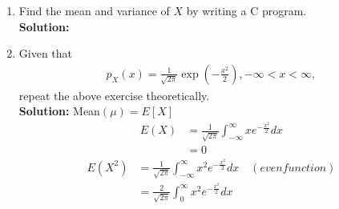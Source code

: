 \documentclass{article}
\numberwithin{equation}{subsection}
\numberwithin{figure}{subsection}
\providecommand{\brak}[1]{\ensuremath{\left(#1\right)}}
\providecommand{\sbrak}[1]{\ensuremath{{}\left[#1\right]}}
\newcommand{\solution}{\noindent \textbf{Solution: }}
\renewcommand\thesection{\arabic{section}}
\renewcommand\thesubsection{\thesection.\arabic{subsection}}
\begin{document}
\begin{enumerate}[label=\thesubsection.\arabic*,ref=\thesubsection.\arabic{figure}]
What properties does the PDF have?
\\
\solution The PDF of $X$ is plotted in Fig. \ref{fig:gauss_pdf} using the code below
\begin{center}
\end{center}
\begin{figure}
\centering
\texttt{[image: ../dig\_com/Figs/pdf\_clt1.pdf]}  
\caption{The PDF of $X$}
\label{fig:gauss_pdf}
\end{figure}
\textbf{Properties} : 
\begin{itemize}
\item Mean,median and mode are equal.
\item The curve is bell-shaped and symmetric about mean.
\item Area under the curve=1.
\end{itemize}
\item Find the mean and variance of $X$ by writing a C program.\\
\solution 
\begin{center}
\end{center}
\begin{center}
\end{center}
\item Given that 
\begin{align}
p_{X}(x) = \frac{1}{\sqrt{2\pi}}\exp\brak{-\frac{x^2}{2}}, -\infty < x < \infty,
\end{align}
repeat the above exercise theoretically.\\
\solution
Mean$(\mu) = E\sbrak{X}$
\begin{align}
    E(X) &= \frac{1}{\sqrt{2\pi}} \int_{-\infty}^{\infty} x e^{-\frac{x^2}{2}}dx\\
    &=0 
\end{align}
\begin{align}
    E\brak{X^2}&= \frac{1}{\sqrt{2\pi}}\int_{-\infty}^{\infty} x^2
e^ {-\frac{x^2}{2}} dx \quad \brak{even function}\\
    &= \frac{2}{\sqrt{2\pi}} \int_{0}^{\infty} x^2 e^{-\frac{x^2}{2}} dx\\

\end{align}
\end{enumerate}
\end{document}
